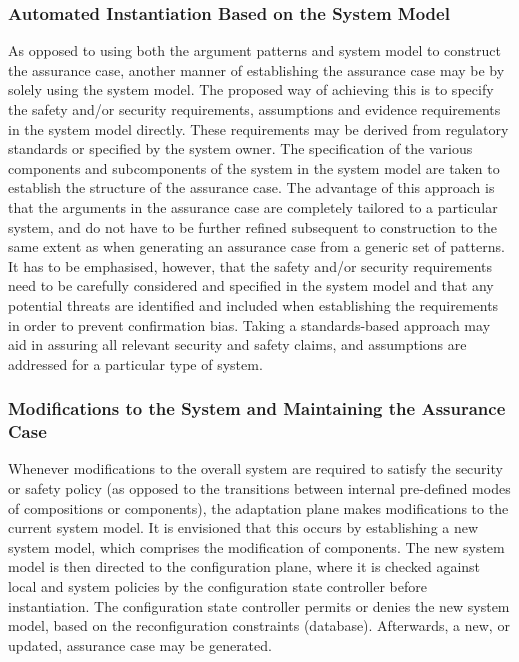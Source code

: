 \documentclass[12pt,twoside,a4paper]{article}
\begin{document}
\subsubsection{Automated Instantiation Based on the System Model}\label{sec:instantiation-systemmodel}
As opposed to using both the argument patterns and system model to construct the assurance case, another manner of establishing the assurance case may be by solely using the system model. The proposed way of achieving this is to specify the safety and/or security requirements, assumptions and evidence requirements in the system model directly. These requirements may be derived from regulatory standards or specified by the system owner. The specification of the various components and subcomponents of the system in the system model are taken to establish the structure of the assurance case. The advantage of this approach is that the arguments in the assurance case are completely tailored to a particular system, and do not have to be further refined subsequent to construction to the same extent as when generating an assurance case from a generic set of patterns. It has to be emphasised, however, that the safety and/or security requirements need to be carefully considered and specified in the system model and that any potential threats are identified and included when establishing the requirements in order to prevent confirmation bias. Taking a standards-based approach may aid in assuring all relevant security and safety claims, and assumptions are addressed for a particular type of system. 

\subsubsection{Modifications to the System and Maintaining the Assurance Case}\label{sec:modifications}
Whenever modifications to the overall system are required to satisfy the security or safety policy (as opposed to the transitions between internal pre-defined modes of compositions or components), the adaptation plane makes modifications to the current system model. It is envisioned that this occurs by establishing a new system model, which comprises the modification of components. The new system model is then directed to the configuration plane, where it is checked against local and system policies by the configuration state controller before instantiation. The configuration state controller permits or denies the new system model, based on the reconfiguration constraints (database). Afterwards, a new, or updated, assurance case may be generated. 
\end{document}
